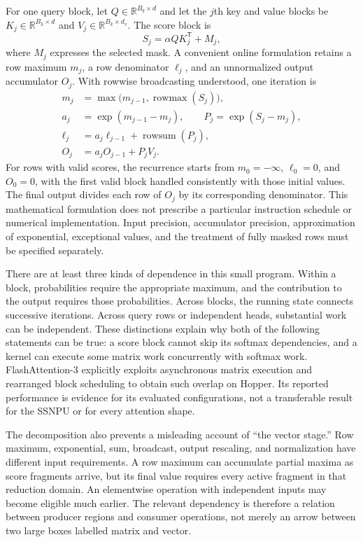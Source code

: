 For one query block, let $Q\in\mathbb{R}^{B_q\times d}$ and let the $j$th key and value blocks be $K_j\in\mathbb{R}^{B_k\times d}$ and $V_j\in\mathbb{R}^{B_k\times d_v}$. The score block is
\begin{equation}
 S_j=\alpha QK_j^{\mathsf T}+M_j,
\end{equation}
where $M_j$ expresses the selected mask. A convenient online formulation retains a row maximum $m_j$, a row denominator $\ell_j$, and an unnormalized output accumulator $O_j$. With rowwise broadcasting understood, one iteration is
\begin{align}
 m_j &= \max\bigl(m_{j-1},\operatorname{rowmax}(S_j)\bigr),\\
 a_j &= \exp(m_{j-1}-m_j),\qquad
 P_j=\exp(S_j-m_j),\\
 \ell_j &= a_j\ell_{j-1}+\operatorname{rowsum}(P_j),\\
 O_j &= a_jO_{j-1}+P_jV_j.
 \label{eq:u001-online-attention}
\end{align}
For rows with valid scores, the recurrence starts from $m_0=-\infty$, $\ell_0=0$, and $O_0=0$, with the first valid block handled consistently with those initial values. The final output divides each row of $O_j$ by its corresponding denominator. This mathematical formulation does not prescribe a particular instruction schedule or numerical implementation. Input precision, accumulator precision, approximation of exponential, exceptional values, and the treatment of fully masked rows must be specified separately.

There are at least three kinds of dependence in this small program. Within a block, probabilities require the appropriate maximum, and the contribution to the output requires those probabilities. Across blocks, the running state connects successive iterations. Across query rows or independent heads, substantial work can be independent. These distinctions explain why both of the following statements can be true: a score block cannot skip its softmax dependencies, and a kernel can execute some matrix work concurrently with softmax work. FlashAttention-3 explicitly exploits asynchronous matrix execution and rearranged block scheduling to obtain such overlap on Hopper. Its reported performance is evidence for its evaluated configurations, not a transferable result for the SSNPU or for every attention shape.~\citep{u001-fa3}

The decomposition also prevents a misleading account of ``the vector stage.'' Row maximum, exponential, sum, broadcast, output rescaling, and normalization have different input requirements. A row maximum can accumulate partial maxima as score fragments arrive, but its final value requires every active fragment in that reduction domain. An elementwise operation with independent inputs may become eligible much earlier. The relevant dependency is therefore a relation between producer regions and consumer operations, not merely an arrow between two large boxes labelled matrix and vector.

